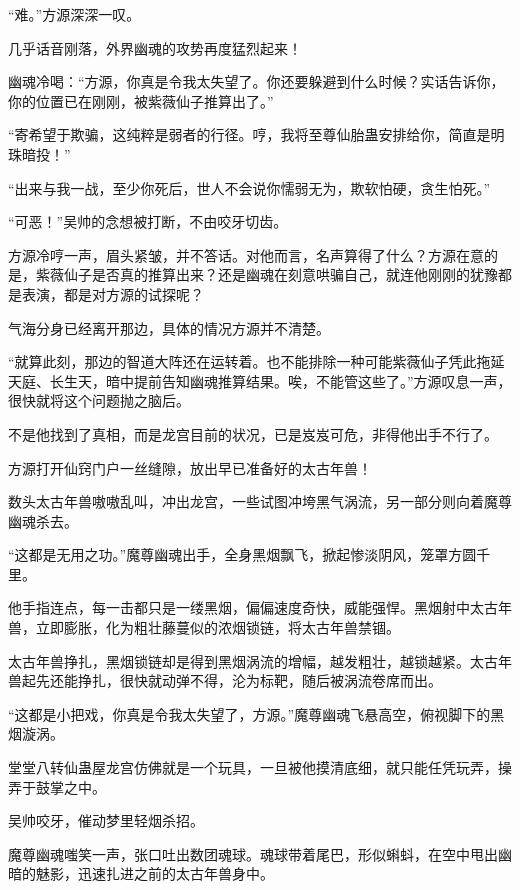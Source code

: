 
\begin{this_body}

“难。”方源深深一叹。

几乎话音刚落，外界幽魂的攻势再度猛烈起来！

幽魂冷喝：“方源，你真是令我太失望了。你还要躲避到什么时候？实话告诉你，你的位置已在刚刚，被紫薇仙子推算出了。”

“寄希望于欺骗，这纯粹是弱者的行径。哼，我将至尊仙胎蛊安排给你，简直是明珠暗投！”

“出来与我一战，至少你死后，世人不会说你懦弱无为，欺软怕硬，贪生怕死。”

“可恶！”吴帅的念想被打断，不由咬牙切齿。

方源冷哼一声，眉头紧皱，并不答话。对他而言，名声算得了什么？方源在意的是，紫薇仙子是否真的推算出来？还是幽魂在刻意哄骗自己，就连他刚刚的犹豫都是表演，都是对方源的试探呢？

气海分身已经离开那边，具体的情况方源并不清楚。

“就算此刻，那边的智道大阵还在运转着。也不能排除一种可能紫薇仙子凭此拖延天庭、长生天，暗中提前告知幽魂推算结果。唉，不能管这些了。”方源叹息一声，很快就将这个问题抛之脑后。

不是他找到了真相，而是龙宫目前的状况，已是岌岌可危，非得他出手不行了。

方源打开仙窍门户一丝缝隙，放出早已准备好的太古年兽！

数头太古年兽嗷嗷乱叫，冲出龙宫，一些试图冲垮黑气涡流，另一部分则向着魔尊幽魂杀去。

“这都是无用之功。”魔尊幽魂出手，全身黑烟飘飞，掀起惨淡阴风，笼罩方圆千里。

他手指连点，每一击都只是一缕黑烟，偏偏速度奇快，威能强悍。黑烟射中太古年兽，立即膨胀，化为粗壮藤蔓似的浓烟锁链，将太古年兽禁锢。

太古年兽挣扎，黑烟锁链却是得到黑烟涡流的增幅，越发粗壮，越锁越紧。太古年兽起先还能挣扎，很快就动弹不得，沦为标靶，随后被涡流卷席而出。

“这都是小把戏，你真是令我太失望了，方源。”魔尊幽魂飞悬高空，俯视脚下的黑烟漩涡。

堂堂八转仙蛊屋龙宫仿佛就是一个玩具，一旦被他摸清底细，就只能任凭玩弄，操弄于鼓掌之中。

吴帅咬牙，催动梦里轻烟杀招。

魔尊幽魂嗤笑一声，张口吐出数团魂球。魂球带着尾巴，形似蝌蚪，在空中甩出幽暗的魅影，迅速扎进之前的太古年兽身中。


\end{this_body}
